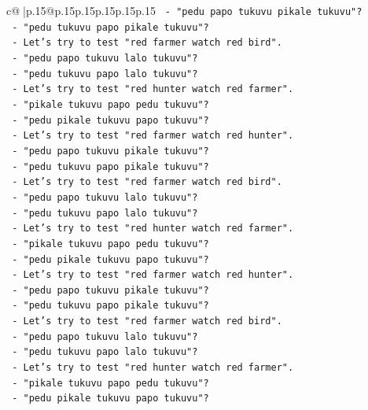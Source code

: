 \documentclass{article}
\begin{document}
{\begin{supertabular}{c@{$\;$}|p{.15\linewidth}@{}p{.15\linewidth}p{.15\linewidth}p{.15\linewidth}p{.15\linewidth}p{.15\linewidth}}
{{{\texttt{         {-} "pedu papo tukuvu pikale tukuvu"?} \\
\texttt{         {-} "pedu tukuvu papo pikale tukuvu"?} \\
\texttt{       {-} Let's try to test "red farmer watch red bird".} \\
\texttt{         {-} "pedu papo tukuvu lalo tukuvu"?} \\
\texttt{         {-} "pedu tukuvu papo lalo tukuvu"?} \\
\texttt{       {-} Let's try to test "red hunter watch red farmer".} \\
\texttt{         {-} "pikale tukuvu papo pedu tukuvu"?} \\
\texttt{         {-} "pedu pikale tukuvu papo tukuvu"?} \\
\texttt{       {-} Let's try to test "red farmer watch red hunter".} \\
\texttt{         {-} "pedu papo tukuvu pikale tukuvu"?} \\
\texttt{         {-} "pedu tukuvu papo pikale tukuvu"?} \\
\texttt{       {-} Let's try to test "red farmer watch red bird".} \\
\texttt{         {-} "pedu papo tukuvu lalo tukuvu"?} \\
\texttt{         {-} "pedu tukuvu papo lalo tukuvu"?} \\
\texttt{       {-} Let's try to test "red hunter watch red farmer".} \\
\texttt{         {-} "pikale tukuvu papo pedu tukuvu"?} \\
\texttt{         {-} "pedu pikale tukuvu papo tukuvu"?} \\
\texttt{       {-} Let's try to test "red farmer watch red hunter".} \\
\texttt{         {-} "pedu papo tukuvu pikale tukuvu"?} \\
\texttt{         {-} "pedu tukuvu papo pikale tukuvu"?} \\
\texttt{       {-} Let's try to test "red farmer watch red bird".} \\
\texttt{         {-} "pedu papo tukuvu lalo tukuvu"?} \\
\texttt{         {-} "pedu tukuvu papo lalo tukuvu"?} \\
\texttt{       {-} Let's try to test "red hunter watch red farmer".} \\
\texttt{         {-} "pikale tukuvu papo pedu tukuvu"?} \\
\texttt{         {-} "pedu pikale tukuvu papo tukuvu"?} \\
}}}
\end{supertabular}}
\end{document}

